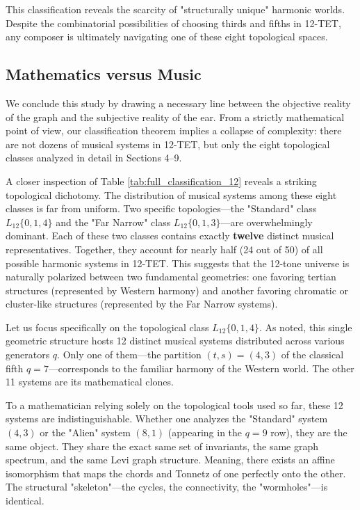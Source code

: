 \documentclass[12pt,letterpaper]{amsart}
\begin{document}
This classification reveals the scarcity of "structurally unique" harmonic worlds. Despite the combinatorial possibilities of choosing thirds and fifths in 12-TET, any composer is ultimately navigating one of these eight topological spaces.


\subsection{Mathematics versus Music}

We conclude this study by drawing a necessary line between the objective reality of the graph and the subjective reality of the ear. From a strictly mathematical point of view, our classification theorem implies a collapse of complexity: there are not dozens of musical systems in 12-TET, but only the eight topological classes analyzed in detail in Sections 4--9.

A closer inspection of Table \ref{tab:full_classification_12} reveals a striking topological dichotomy. The distribution of musical systems among these eight classes is far from uniform. Two specific topologies—the "Standard" class $L_{12}\{0,1,4\}$ and the "Far Narrow" class $L_{12}\{0,1,3\}$—are overwhelmingly dominant. Each of these two classes contains exactly \textbf{twelve} distinct musical representatives. Together, they account for nearly half (24 out of 50) of all possible harmonic systems in 12-TET. This suggests that the 12-tone universe is naturally polarized between two fundamental geometries: one favoring tertian structures (represented by Western harmony) and another favoring chromatic or cluster-like structures (represented by the Far Narrow systems).

Let us focus specifically on the topological class $L_{12}\{0,1,4\}$. As noted, this single geometric structure hosts 12 distinct musical systems distributed across various generators $q$. Only one of them—the partition $(t,s)=(4,3)$ of the classical fifth $q=7$—corresponds to the familiar harmony of the Western world. The other 11 systems are its mathematical clones.

To a mathematician relying solely on the topological tools used so far, these 12 systems are indistinguishable. Whether one analyzes the "Standard" system $(4,3)$ or the "Alien" system $(8,1)$ (appearing in the $q=9$ row), they are the same object. They share the exact same set of invariants, the same graph spectrum, and the same Levi graph structure. Meaning, there exists an affine isomorphism that maps the chords and Tonnetz of one perfectly onto the other. The structural "skeleton"—the cycles, the connectivity, the "wormholes"—is identical.
\end{document}
